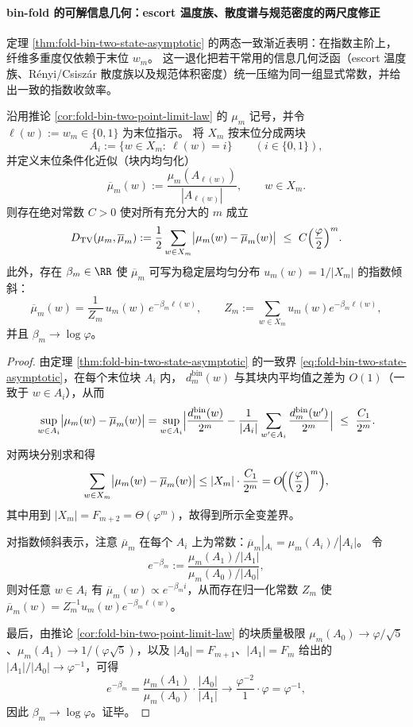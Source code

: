 
\paragraph{bin-fold 的可解信息几何：escort 温度族、散度谱与规范密度的两尺度修正}
定理 \ref{thm:fold-bin-two-state-asymptotic} 的两态一致渐近表明：在指数主阶上，纤维多重度仅依赖于末位 \(w_m\)。
这一退化把若干常用的信息几何泛函（escort 温度族、Rényi/Csiszár 散度族以及规范体积密度）统一压缩为同一组显式常数，并给出一致的指数收敛率。

\begin{proposition}\label{prop:fold-bin-lastbit-sufficient-tv}
沿用推论 \ref{cor:fold-bin-two-point-limit-law} 的 \(\mu_m\) 记号，并令 \(\ell(w):=w_m\in\{0,1\}\) 为末位指示。
将 \(X_m\) 按末位分成两块
\[
A_i:=\{w\in X_m:\ \ell(w)=i\}\qquad(i\in\{0,1\}),
\]
并定义末位条件化近似（块内均匀化）
\[
\overline\mu_m(w):=\frac{\mu_m(A_{\ell(w)})}{|A_{\ell(w)}|},\qquad w\in X_m.
\]
则存在绝对常数 \(C>0\) 使对所有充分大的 \(m\) 成立
\[
D_{\mathrm{TV}}(\mu_m,\overline\mu_m)
:=\frac12\sum_{w\in X_m}\bigl|\mu_m(w)-\overline\mu_m(w)\bigr|
\ \le\ C\Bigl(\frac{\varphi}{2}\Bigr)^m.
\]
此外，存在 \(\beta_m\in\RR\) 使 \(\overline\mu_m\) 可写为稳定层均匀分布 \(u_m(w)=1/|X_m|\) 的指数倾斜：
\[
\overline\mu_m(w)=\frac{1}{Z_m}\,u_m(w)\,e^{-\beta_m\ell(w)},
\qquad
Z_m:=\sum_{w\in X_m}u_m(w)e^{-\beta_m\ell(w)},
\]
并且 \(\beta_m\to\log\varphi\)。
\end{proposition}
\begin{proof}
由定理 \ref{thm:fold-bin-two-state-asymptotic} 的一致界 \eqref{eq:fold-bin-two-state-asymptotic}，在每个末位块 \(A_i\) 内，
\(
d^{\mathrm{bin}}_m(w)
\)
与其块内平均值之差为 \(O(1)\)（一致于 \(w\in A_i\)），从而
\[
\sup_{w\in A_i}\bigl|\mu_m(w)-\overline\mu_m(w)\bigr|
=\sup_{w\in A_i}\Bigl|\frac{d^{\mathrm{bin}}_m(w)}{2^m}-\frac{1}{|A_i|}\sum_{w'\in A_i}\frac{d^{\mathrm{bin}}_m(w')}{2^m}\Bigr|
\ \le\ \frac{C_1}{2^m}.
\]
对两块分别求和得
\[
\sum_{w\in X_m}\bigl|\mu_m(w)-\overline\mu_m(w)\bigr|
\le
|X_m|\cdot \frac{C_1}{2^m}
=O\!\Bigl(\Bigl(\frac{\varphi}{2}\Bigr)^m\Bigr),
\]
其中用到 \(|X_m|=F_{m+2}=\Theta(\varphi^m)\)，故得到所示全变差界。
\par
对指数倾斜表示，注意 \(\overline\mu_m\) 在每个 \(A_i\) 上为常数：\(\overline\mu_m|_{A_i}=\mu_m(A_i)/|A_i|\)。
令
\[
e^{-\beta_m}:=\frac{\mu_m(A_1)/|A_1|}{\mu_m(A_0)/|A_0|},
\]
则对任意 \(w\in A_i\) 有 \(\overline\mu_m(w)\propto e^{-\beta_m i}\)，从而存在归一化常数 \(Z_m\) 使
\(
\overline\mu_m(w)=Z_m^{-1}u_m(w)e^{-\beta_m\ell(w)}
\)。
\par
最后，由推论 \ref{cor:fold-bin-two-point-limit-law} 的块质量极限
\(\mu_m(A_0)\to \varphi/\sqrt5\)、\(\mu_m(A_1)\to 1/(\varphi\sqrt5)\)，以及 \(|A_0|=F_{m+1}\)、\(|A_1|=F_m\) 给出的
\(|A_1|/|A_0|\to \varphi^{-1}\)，可得
\[
e^{-\beta_m}
=\frac{\mu_m(A_1)}{\mu_m(A_0)}\cdot\frac{|A_0|}{|A_1|}
\longrightarrow
\frac{\varphi^{-2}}{1}\cdot \varphi
=\varphi^{-1},
\]
因此 \(\beta_m\to\log\varphi\)。证毕。
\end{proof}

